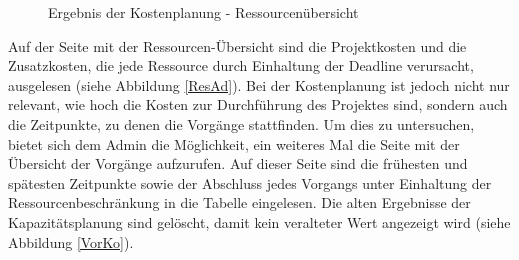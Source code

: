 \documentclass[a4paper,12pt,parskip,bibtotoc,liststotoc]{article}
\begin{document}
\begin{figure}[h!]
  \begin{center}
    \caption{Ergebnis der Kostenplanung - Ressourcenübersicht}  \label{ResKo}
  \end{center}
\end{figure}


Auf der Seite mit der Ressourcen-Übersicht sind die Projektkosten und die Zusatzkosten, die jede Ressource durch Einhaltung der Deadline verursacht, ausgelesen (siehe Abbildung \ref{ResAd}). Bei der Kostenplanung ist jedoch nicht nur relevant, wie hoch die Kosten zur Durchführung des Projektes sind, sondern auch die Zeitpunkte, zu denen die Vorgänge stattfinden. Um dies zu untersuchen, bietet sich dem Admin die Möglichkeit, ein weiteres Mal die Seite mit der Übersicht der Vorgänge aufzurufen. Auf dieser Seite sind die frühesten und spätesten Zeitpunkte sowie der Abschluss jedes Vorgangs unter Einhaltung der Ressourcenbeschränkung in die Tabelle eingelesen. Die alten Ergebnisse der Kapazitätsplanung sind gelöscht, damit kein veralteter Wert angezeigt wird (siehe Abbildung \ref{VorKo}).\\  
\end{document}
